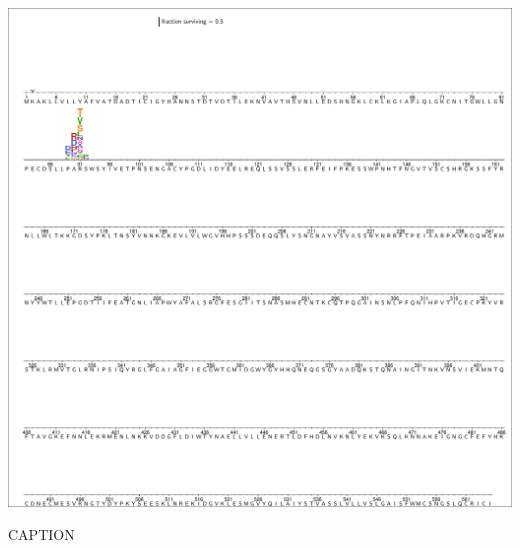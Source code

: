 \documentclass[11pt]{article}
\begin{document}
\begin{suppfigure}
\centerline{\includegraphics[trim=0.1cm 0.02cm 0.1cm 0.03cm,clip=true,width=\textwidth]{figs/logoplots/H17L7_fracsurvive.pdf}}
\caption{\label{suppfig:H17L7logo}
CAPTION}
\end{suppfigure}
\end{document}
